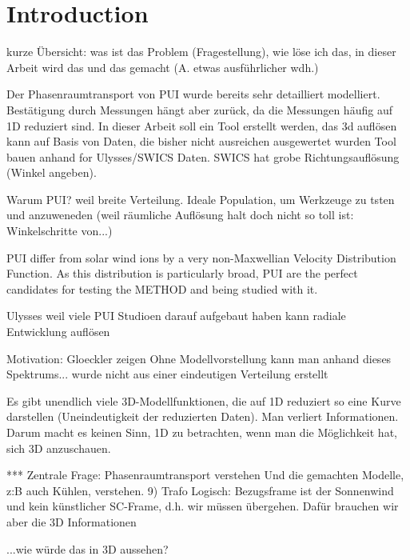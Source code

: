 
\chapter{Introduction} %

\label{chap:intro} %


kurze Übersicht:
was ist das Problem (Fragestellung), wie löse ich das, in dieser Arbeit wird das und das gemacht
(A. etwas ausführlicher wdh.)

Der Phasenraumtransport von PUI wurde bereits sehr detailliert modelliert. Bestätigung durch Messungen hängt aber zurück, da die Messungen häufig auf 1D reduziert sind.
In dieser Arbeit soll ein Tool erstellt werden, das 3d auflösen kann auf Basis von Daten, die bisher nicht ausreichen ausgewertet wurden
Tool bauen anhand for Ulysses/SWICS Daten. SWICS hat grobe Richtungsauflösung (Winkel angeben). 



Warum PUI?
weil breite Verteilung. Ideale Population, um Werkzeuge zu tsten und anzuweneden
(weil räumliche Auflösung halt doch nicht so toll ist: Winkelschritte von...)

PUI differ from solar wind ions by a very non-Maxwellian Velocity Distribution Function. As this distribution is particularly broad, PUI are the perfect candidates for testing the METHOD and being studied with it.



Ulysses
weil viele PUI Studioen darauf aufgebaut haben
kann radiale Entwicklung auflösen




Motivation:
Gloeckler zeigen
Ohne Modellvorstellung kann man anhand dieses Spektrums...
wurde nicht aus einer eindeutigen Verteilung erstellt

Es gibt unendlich viele 3D-Modellfunktionen, die auf 1D reduziert so eine Kurve darstellen (Uneindeutigkeit der reduzierten Daten). Man verliert Informationen. Darum macht es keinen Sinn, 1D zu betrachten, wenn man die Möglichkeit hat, sich 3D anzuschauen. 

***
Zentrale Frage: Phasenraumtransport verstehen
Und die gemachten Modelle, z:B auch Kühlen, verstehen.
9) Trafo
Logisch: Bezugsframe ist der Sonnenwind und kein künstlicher SC-Frame, d.h. wir müssen übergehen. Dafür brauchen wir aber die 3D Informationen

...wie würde das in 3D aussehen?

